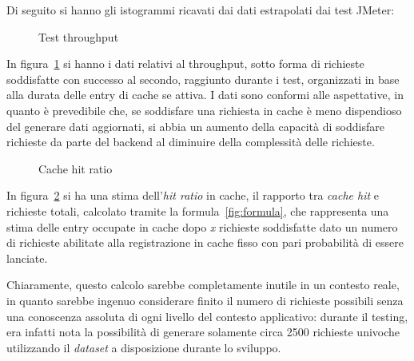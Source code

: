 Di seguito si hanno gli istogrammi ricavati dai dati estrapolati dai test JMeter: 
\begin{figure}[hbpt!]
\caption{Test throughput}
\label{fig:throughput}

\end{figure}
\FloatBarrier

In figura~\ref{fig:throughput} si hanno i dati relativi al throughput, sotto forma di richieste soddisfatte con successo al secondo, raggiunto durante i test, organizzati in base alla durata delle entry di cache se attiva.
I dati sono conformi alle aspettative, in quanto è prevedibile che, se soddisfare una richiesta in cache è meno dispendioso del generare dati aggiornati, si abbia un aumento della capacità di soddisfare richieste da parte del backend al diminuire della complessità delle richieste.



\begin{figure}[h!]

\caption{Cache hit ratio}
\label{fig:hitratio}

\end{figure}
\FloatBarrier
In figura~\ref{fig:hitratio} si ha una stima dell'\textit{hit ratio} in cache, il rapporto tra \textit{cache hit} e richieste totali, calcolato tramite la formula~\ref{fig:formula}, che rappresenta una stima delle entry occupate in cache dopo \emph{x} richieste soddisfatte dato un numero di richieste abilitate alla registrazione in cache fisso con pari probabilità di essere lanciate.

Chiaramente, questo calcolo sarebbe completamente inutile in un contesto reale, in quanto sarebbe ingenuo considerare finito il numero di richieste possibili senza una conoscenza assoluta di ogni livello del contesto applicativo: durante il testing, era infatti nota la possibilità di generare solamente circa 2500 richieste univoche utilizzando il \textit{dataset} a disposizione durante lo sviluppo.

